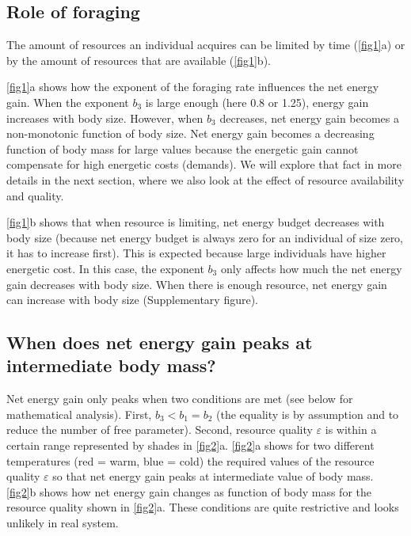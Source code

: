 
\subsection*{Role of foraging}
The amount of resources an individual acquires can be limited by time (\cref{fig1}a) or by the amount of resources that are available (\cref{fig1}b).

\cref{fig1}a shows how the exponent of the foraging rate influences the net energy gain.
When the exponent $b_3$ is large enough (here 0.8 or 1.25), energy gain increases with body size.
However, when $b_3$ decreases, net energy gain becomes a non-monotonic function of body size.
Net energy gain becomes a decreasing function of body mass for large values because the energetic gain cannot compensate for high energetic costs (demands).
We will explore that fact in more details in the next section, where we also look at the effect of resource availability and quality.     

\cref{fig1}b shows that when resource is limiting, net energy budget decreases with body size (because net energy budget is always zero for an individual of size zero, it has to increase first).
This is expected because large individuals have higher energetic cost.
In this case, the exponent $b_3$ only affects how much the net energy gain decreases with body size. 
When there is enough resource, net energy gain can increase with body size (Supplementary figure). 

\subsection*{When does net energy gain peaks at intermediate body mass?}
Net energy gain only peaks when two conditions  are met (see below for mathematical analysis).
First, $b_3 < b_1 = b_2$ (the equality is by assumption and to reduce the number of free parameter).
Second, resource quality $\varepsilon$ is within a certain range represented by shades in \cref{fig2}a.
\cref{fig2}a shows for two different temperatures (red = warm, blue = cold) the required values of the resource quality $\varepsilon$ so that net energy gain peaks at intermediate value of body mass.
\cref{fig2}b shows how net energy gain changes as function of body mass for the resource quality shown in \cref{fig2}a.
These conditions are quite restrictive and looks unlikely in real system.

